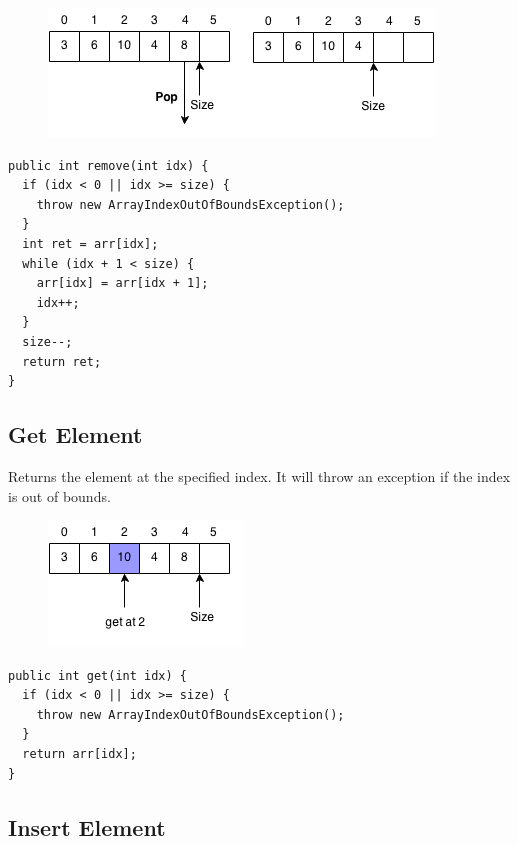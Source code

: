 \documentclass[11pt,oneside]{book}
\makeatletter
\def\maxwidth#1{\ifdim\Gin@nat@width>#1 #1\else\Gin@nat@width\fi}
\makeatother
\begin{document}
\vspace{5px}\begin{figure}[H]\centering
        \includegraphics[width=0.66\maxwidth{\textwidth}]{vector4.png}
        \end{figure}

\begin{lstlisting}
public int remove(int idx) {
  if (idx < 0 || idx >= size) {
    throw new ArrayIndexOutOfBoundsException();
  }
  int ret = arr[idx];
  while (idx + 1 < size) {
    arr[idx] = arr[idx + 1];
    idx++;
  }
  size--;
  return ret;
}
\end{lstlisting}

\subsection{Get Element}

Returns the element at the specified index. It will throw an exception if the index is out of bounds.

\vspace{5px}\begin{figure}[H]\centering
        \includegraphics[width=0.66\maxwidth{\textwidth}]{vectorget.png}
        \end{figure}

\begin{lstlisting}
public int get(int idx) {
  if (idx < 0 || idx >= size) {
    throw new ArrayIndexOutOfBoundsException();
  }
  return arr[idx];
}
\end{lstlisting}

\subsection{Insert Element}
\end{document}
